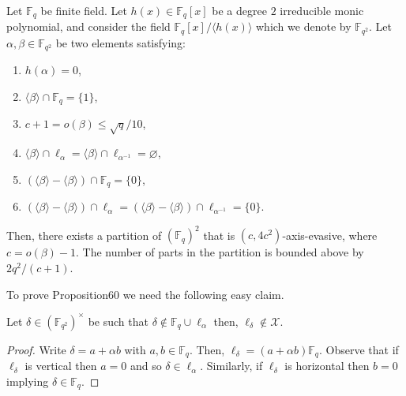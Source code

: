 \begin{ntproposition}
Let $\mathbb F_q$ be finite field. Let $h(x)\in\mathbb F_q[x]$ be a degree $2$ irreducible monic polynomial, and consider the field $\mathbb F_q[x]/\langle h(x)\rangle$ which we denote by $\mathbb F_{q^2}$. Let $\alpha,\beta\in\mathbb F_{q^2}$ be two elements satisfying:
\begin{enumerate}
\item $h(\alpha)=0$,
\item $\langle\beta\rangle\cap\mathbb F_q=\{1\}$,
\item $c+1=o(\beta)\leq\sqrt q/10$,
\item $\langle\beta\rangle\cap\ell_\alpha=\langle\beta\rangle\cap\ell_{\alpha^{-1}}=\varnothing$,
\item $(\langle\beta\rangle-\langle\beta\rangle)\cap\mathbb F_q=\{0\}$,
\item $(\langle\beta\rangle-\langle\beta\rangle)\cap\ell_\alpha=(\langle\beta\rangle-\langle\beta\rangle)\cap\ell_{\alpha^{-1}}=\{0\}$.
\end{enumerate}
Then, there exists a partition of $(\mathbb F_q)^2$ that is $(c,4c^2)$-axis-evasive, where $c=o(\beta)-1$. The number of parts in the partition is bounded above by $2q^2/(c+1)$.
\end{ntproposition}
To prove Proposition60 we need the following easy claim.
\begin{ntclaim}
Let $\delta\in(\mathbb F_{q^2})^\times$ be such that $\delta\notin\mathbb F_q\cup\ell_\alpha$ then, $\ell_\delta\notin\mathcal X$.
\end{ntclaim}
\begin{proof}
Write $\delta=a+\alpha b$ with $a,b\in\mathbb F_q$. Then, $\ell_\delta=(a+\alpha b)\mathbb F_q$. Observe that if $\ell_\delta$ is vertical then $a=0$ and so $\delta\in\ell_\alpha$. Similarly, if $\ell_\delta$ is horizontal then $b=0$ implying $\delta\in\mathbb F_q$.
\end{proof}

